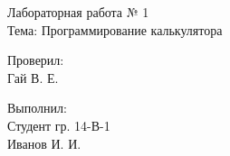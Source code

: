 \thispagestyle{empty}%
\begin{center}%
	\MakeUppercase{\thesisOrganization}
\end{center}%
%
\vspace{0pt plus4fill} %
%
\vspace{0pt plus6fill} %
%
\vspace{0pt plus1fill} %
\begin{center}%

\begin{Large}
Лабораторная работа № 1\\
Тема: Программирование калькулятора
	
\end{Large}
	
\end{center}%
%
\vspace{0pt plus5fill} %
\begin{flushright}%
Проверил:\\
Гай В. Е.

Выполнил:\\
Студент гр. 14-В-1\\
Иванов И. И.
\end{flushright}%
%
\vspace{0pt plus4fill} %
\begin{center}%
	{\thesisCity~ \thesisYear}
\end{center}%
\newpage